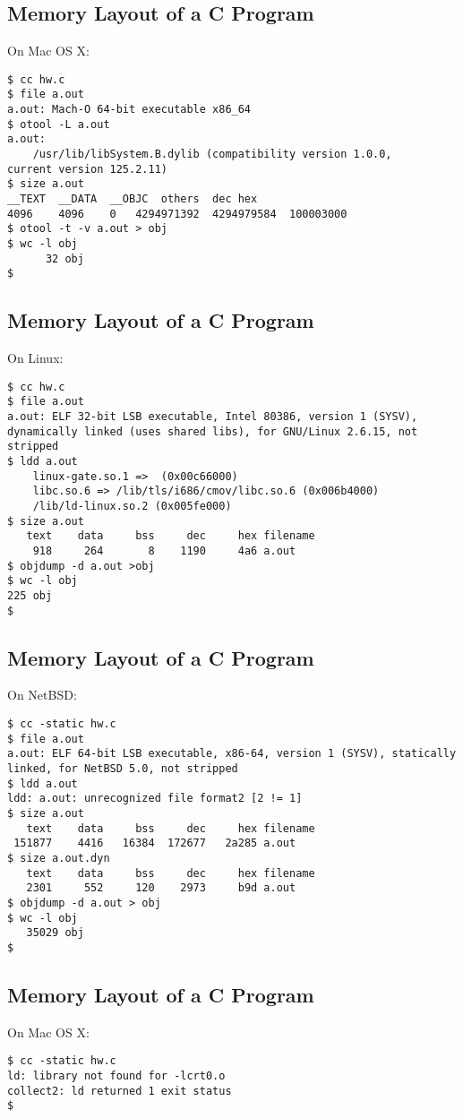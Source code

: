 \documentclass[xga]{xdvislides}
\begin{document}
\subsection{Memory Layout of a C Program}
On Mac OS X:
\begin{verbatim}
$ cc hw.c
$ file a.out
a.out: Mach-O 64-bit executable x86_64
$ otool -L a.out
a.out:
	/usr/lib/libSystem.B.dylib (compatibility version 1.0.0,
current version 125.2.11)
$ size a.out
__TEXT	__DATA	__OBJC	others	dec	hex
4096	4096	0	4294971392	4294979584	100003000
$ otool -t -v a.out > obj
$ wc -l obj
      32 obj
$
\end{verbatim}

\subsection{Memory Layout of a C Program}
On Linux:
\begin{verbatim}
$ cc hw.c
$ file a.out
a.out: ELF 32-bit LSB executable, Intel 80386, version 1 (SYSV),
dynamically linked (uses shared libs), for GNU/Linux 2.6.15, not stripped
$ ldd a.out
	linux-gate.so.1 =>  (0x00c66000)
	libc.so.6 => /lib/tls/i686/cmov/libc.so.6 (0x006b4000)
	/lib/ld-linux.so.2 (0x005fe000)
$ size a.out
   text	   data	    bss	    dec	    hex	filename
    918	    264	      8	   1190	    4a6	a.out
$ objdump -d a.out >obj
$ wc -l obj
225 obj
$
\end{verbatim}

\subsection{Memory Layout of a C Program}
On NetBSD:
\begin{verbatim}
$ cc -static hw.c
$ file a.out
a.out: ELF 64-bit LSB executable, x86-64, version 1 (SYSV), statically
linked, for NetBSD 5.0, not stripped
$ ldd a.out
ldd: a.out: unrecognized file format2 [2 != 1]
$ size a.out
   text    data     bss     dec     hex filename
 151877    4416   16384  172677   2a285 a.out
$ size a.out.dyn
   text    data     bss     dec     hex filename
   2301     552     120    2973     b9d a.out
$ objdump -d a.out > obj
$ wc -l obj
   35029 obj
$
\end{verbatim}

\subsection{Memory Layout of a C Program}
On Mac OS X:
\begin{verbatim}
$ cc -static hw.c
ld: library not found for -lcrt0.o
collect2: ld returned 1 exit status
$
\end{verbatim}
\end{document}
